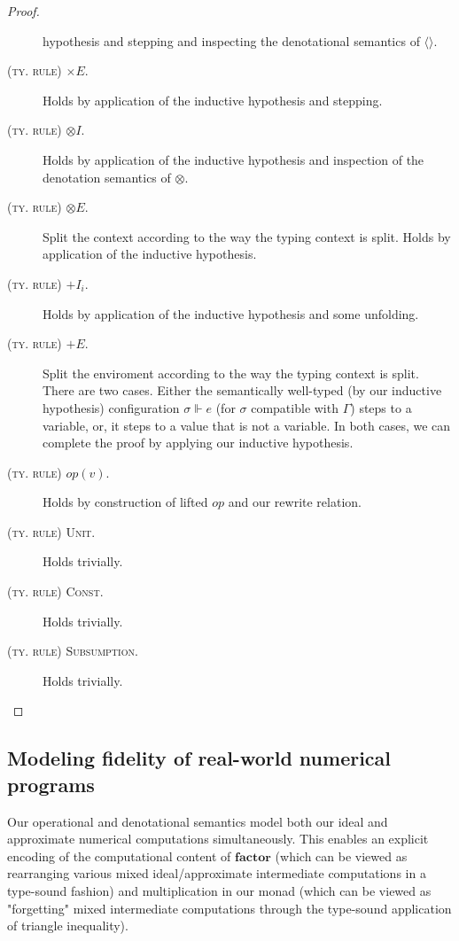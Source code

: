 \begin{proof}
\begin{description}
    hypothesis and stepping and inspecting the denotational semantics of
    $\langle \rangle$.
  \item[\textsc{(ty. rule) $\times E$.}] Holds by application of the inductive
    hypothesis and stepping.
  \item[\textsc{(ty. rule) $\otimes I$.}] Holds by application of the inductive
    hypothesis and inspection of the denotation semantics of $\otimes$.
  \item[\textsc{(ty. rule) $\otimes E$.}] Split the context according to the way
    the typing context is split. Holds by application of the inductive
    hypothesis.
  \item[\textsc{(ty. rule) $+ I_i$.}] Holds by application of the inductive
    hypothesis and some unfolding.
  \item[\textsc{(ty. rule) $+ E$.}] Split the enviroment according to the way
    the typing context is split. There are two cases. Either the semantically
    well-typed (by our inductive hypothesis) configuration $\sigma \Vdash e$
    (for $\sigma$ compatible with $\Gamma$) steps to a variable, or, it steps to
    a value that is not a variable. In both cases, we can complete the proof by
    applying our inductive hypothesis.
  \item[\textsc{(ty. rule) $\textit{op}(v)$.}] Holds by construction of
    lifted $\textit{op}$ and our rewrite relation.
  \item[\textsc{(ty. rule) Unit.}] Holds trivially.
  \item[\textsc{(ty. rule) Const.}] Holds trivially.
  \item[\textsc{(ty. rule) Subsumption.}] Holds trivially.
\end{description}
\end{proof}

\subsection{Modeling fidelity of real-world numerical programs}
Our operational and denotational semantics model both our ideal and approximate
numerical computations simultaneously. This enables an explicit encoding of the
computational content of $\textbf{factor}$ (which can be viewed as rearranging
various mixed ideal/approximate intermediate computations in a type-sound
fashion) and multiplication in our monad (which can be viewed as "forgetting"
mixed intermediate computations through the type-sound application of triangle
inequality).

